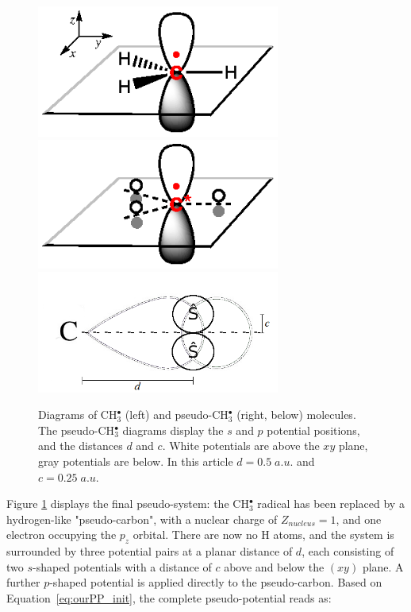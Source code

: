 \documentclass[aip]{revtex4-1}
\begin{document}
\begin{figure}
\begin{center}
\includegraphics[width=8cm]{ch3_p}
\includegraphics[width=8cm]{ch3_pseudo_p}
\includegraphics[width=8cm]{tm_sp2_potentials}
\end{center}
\caption{Diagrams of CH\(^{\bullet}_{3}\) (left) and pseudo-CH\(^{\bullet}_{3}\)
(right, below) molecules.
The pseudo-CH\(^{\bullet}_{3}\) diagrams display the \(s\) and \(p\) potential positions,
and the distances \(d\) and \(c\). White potentials are above the $xy$ plane, 
gray potentials are below.
In this article $d=0.5\;a.u.$ and $c=0.25\;a.u.$}
\label{figure:ref_pseudo_diagram}
\end{figure}

Figure \ref{figure:ref_pseudo_diagram} displays the final pseudo-system: the CH\(^{\bullet}_{3}\) radical has been replaced by
a hydrogen-like "pseudo-carbon", with a nuclear charge of \(Z_{nucleus} = 1\), and one electron occupying the \(p_{z}\) orbital. 
There are now no H atoms, and the system is surrounded by three potential pairs at a planar distance of \(d\), each consisting of 
two \(s\)-shaped potentials with a distance of \(c\) above and below the \((xy)\) plane. 
A further \(p\)-shaped potential is applied directly to the pseudo-carbon.
Based on Equation~\ref{eq:ourPP_init}, the complete pseudo-potential reads as:
\end{document}

